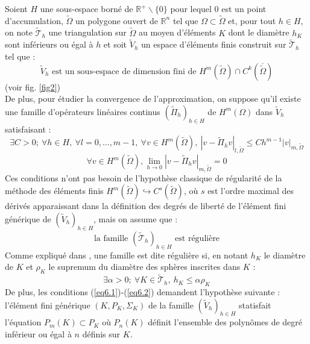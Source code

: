 \documentclass{article}
\begin{document}
Soient $H$ une sous-espace borné de $\mathbb{R}^+\backslash\{0\}$ pour lequel $0$ est un point d'accumulation, $\tilde{\Omega}$ un polygone ouvert de $\mathbb{R}^n$ tel que $\Omega\subset\tilde{\Omega}$ et, pour tout $h\in H$, on note $\tilde{\mathscr{T}}_h$ une triangulation sur $\tilde{\Omega}$ au moyen d'éléments $K$ dont le diamètre $h_K$ sont inférieurs ou égal à $h$ et soit $\tilde{V}_h$ un espace d'éléments finis construit sur $\tilde{\mathscr{T}}_h$ tel que :
\begin{equation} \label{eq5} \tilde{V}_h \text{ est un sous-espace de dimension fini de } H^m\left(\tilde{\Omega}\right)\cap C^k\left(\overline{\tilde{\Omega}}\right) \end{equation}
(voir fig. \ref{fig2})
\\
De plus, pour étudier la convergence de l'approximation, on suppose qu'il existe une famille d'opérateurs linéaires continus $(\tilde{\Pi}_h)_{h\in H}$ de $H^m(\Omega)$ dans $\tilde{V}_h$ satisfaisant :
\begin{equation} \label{eq6.1}
	\exists C>0;\ \forall h\in H,\ \forall l=0,...,m-1,\ \forall v\in H^m(\tilde{\Omega}),\ \left| v-\tilde{\Pi}_h v\right|_{l,\tilde{\Omega}}\leq Ch^{m-1}|v|_{m,\tilde{\Omega}}
\end{equation}
\begin{equation} \label{eq6.2}
	\forall v\in H^m(\tilde{\Omega}), \lim_{h\to 0} \left|v-\tilde{\Pi}_h v \right|_{m,\tilde{\Omega}}=0
\end{equation}
Ces conditions n'ont pas besoin de l'hypothèse classique de régularité de la méthode des éléments finis $H^m(\tilde{\Omega})\hookrightarrow C^s(\tilde{\Omega})$, où $s$ est l'ordre maximal des dérivés apparaissant dans la définition des degrés de liberté de l'élément fini générique de $(\tilde{V}_h)_{h\in H}$, mais on assume que :
\begin{equation} \label{eq7} \text{la famille } (\tilde{\mathscr{T}}_h)_{h\in H} \text{ est régulière} \end{equation}
Comme expliqué dans \cite{ciarlet72gal}, une famille est dite régulière si, en notant $h_K$ le diamètre de $K$ et $\rho_K$ le supremum du diamètre des sphères inscrites dans $K$ :
	\[\exists \alpha>0;\ \forall K\in\tilde{\mathscr{T}}_h,\ h_K\leq \alpha \rho_K\]
De plus, les conditions (\ref{eq6.1})-(\ref{eq6.2}) demandent l'hypothèse suivante : l'élément fini générique $(K,P_K,\Sigma_K)$ de la famille $(\tilde{V}_h)_{h\in H}$ statisfait l'équation $P_m(K)\subset P_K$ où $P_n(K)$ définit l'ensemble des polynômes de degré inférieur ou égal à $n$ définis sur $K$.
\end{document}
